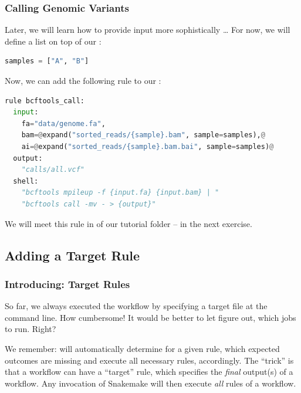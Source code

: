 \begin{frame}[fragile]
  \frametitle{Calling Genomic Variants}
  Later, we will learn how to provide input more sophistically \ldots\newline
  For now, we will define a list on top of our :
  \begin{lstlisting}[language=Python,style=Python]
samples = ["A", "B"]
  \end{lstlisting}
  Now, we can add the following rule to our :
  \begin{lstlisting}[language=Python,style=Python,basicstyle=\footnotesize]
rule bcftools_call:
  input:
    fa="data/genome.fa",
    bam=@expand("sorted_reads/{sample}.bam", sample=samples),@
    ai=@expand("sorted_reads/{sample}.bam.bai", sample=samples)@
  output:
    "calls/all.vcf"
  shell:
    "bcftools mpileup -f {input.fa} {input.bam} | "
    "bcftools call -mv - > {output}"
  \end{lstlisting}
  We will meet this rule in  of our tutorial folder -- in the next exercise.
\end{frame}

\subsection{Adding a Target Rule}

\begin{frame}
	\frametitle{Introducing: Target Rules}
	\begin{question}
	  So far, we always executed the workflow by specifying a target file at the command line. How cumbersome!\newline
	  It would be better to let \Snakemake{} figure out, which jobs to run. Right?
	\end{question}
    \pause
	\begin{docs}
		We remember: \Snakemake{} will automatically determine for a given rule, which expected outcomes are missing and execute all necessary rules, accordingly.\newline\pause
		The ``trick'' is that a workflow can have a ``target'' rule, which specifies the \emph{final} output(s) of a workflow. Any invocation of Snakemake will then execute \emph{all} rules of a workflow.
	\end{docs}
\end{frame}

